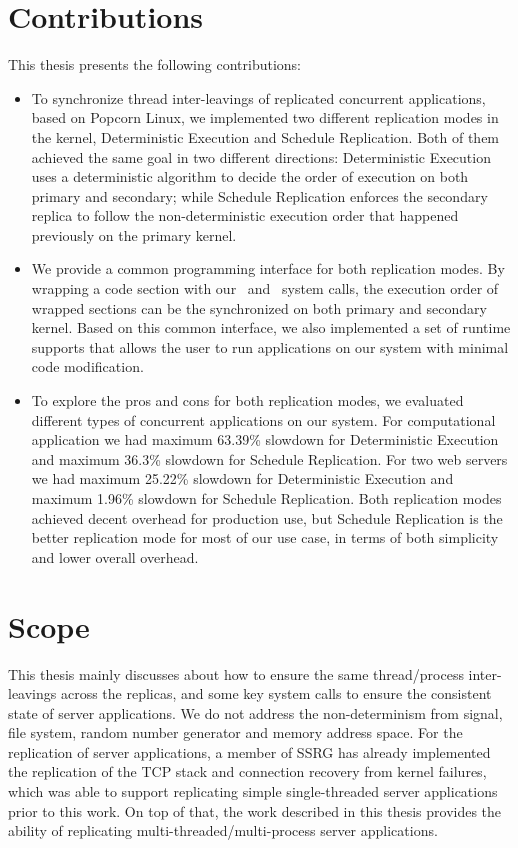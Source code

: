 
\section{Contributions}

This thesis presents the following contributions:

\begin{itemize}
\item To synchronize thread inter-leavings of replicated concurrent applications, based on Popcorn Linux, we implemented two different replication modes in the kernel, Deterministic Execution and Schedule Replication. Both of them achieved the same goal in two different directions: Deterministic Execution uses a deterministic algorithm to decide the order of execution on both primary and secondary; while Schedule Replication enforces the secondary replica to follow the non-deterministic execution order that happened previously on the primary kernel.

\item We provide a common programming interface for both replication modes. By wrapping a code section with our \detstart\ and \detend\ system calls, the execution order of wrapped sections can be the synchronized on both primary and secondary kernel. Based on this common interface, we also implemented a set of runtime supports that allows the user to run applications on our system with minimal code modification.

\item To explore the pros and cons for both replication modes, we evaluated different types of concurrent applications on our system. For computational application we had maximum 63.39\% slowdown for Deterministic Execution and maximum 36.3\% slowdown for Schedule Replication. For two web servers we had maximum 25.22\% slowdown for Deterministic Execution and maximum 1.96\% slowdown for Schedule Replication. Both replication modes achieved decent overhead for production use, but Schedule Replication is the better replication mode for most of our use case, in terms of both simplicity and lower overall overhead.
\end{itemize}

\section{Scope}
This thesis mainly discusses about how to ensure the same thread/process inter-leavings across the replicas, and some key system calls to ensure the consistent state of server applications. We do not address the non-determinism from signal, file system, random number generator and memory address space. For the replication of server applications, a member of SSRG has already implemented the replication of the TCP stack and connection recovery from kernel failures, which was able to support replicating simple single-threaded server applications prior to this work. On top of that, the work described in this thesis provides the ability of replicating multi-threaded/multi-process server applications.

